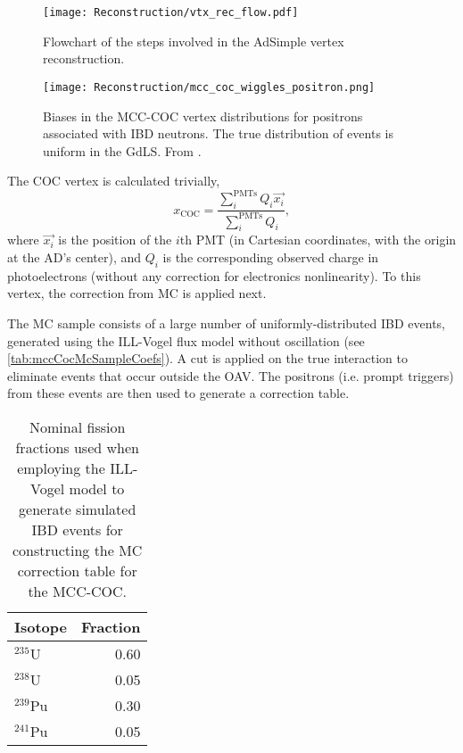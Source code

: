 \documentclass[../thesis.tex]{subfiles}
\begin{document}
\begin{figure}[h]
  \texttt{[image: Reconstruction/vtx\_rec\_flow.pdf]}
  \caption{Flowchart of the steps involved in the AdSimple vertex reconstruction.}
  \label{fig:vtx_rec_flow}
\end{figure}


\begin{figure}[h]
  \texttt{[image: Reconstruction/mcc\_coc\_wiggles\_positron.png]}
  \caption{Biases in the MCC-COC vertex distributions for positrons associated with IBD neutrons. The true distribution of events is uniform in the GdLS. From \cite{adsimple1}.}
  \label{fig:reconMccCocWiggles}
\end{figure}

The COC vertex is calculated trivially,
\begin{equation}
  x_{\mathrm{COC}} = \frac{\sum_{i}^{\mathrm{PMTs}} Q_i \vec{x_i}}{\sum_i^{\mathrm{PMTs}} Q_i},
\end{equation}
where $\vec{x_i}$ is the position of the $i$th PMT (in Cartesian coordinates, with the origin at the AD's center), and $Q_i$ is the corresponding observed charge in photoelectrons (without any correction for electronics nonlinearity). To this vertex, the correction from MC is applied next.

The MC sample consists of a large number of uniformly-distributed IBD events, generated using the ILL-Vogel flux model without oscillation (see \autoref{tab:mccCocMcSampleCoefs}). A cut is applied on the true interaction to eliminate events that occur outside the OAV. The positrons (i.e. prompt triggers) from these events are then used to generate a correction table.

\begin{table}[h]
  \begin{tabular}{lr}
    \toprule
    Isotope & Fraction \\
    \midrule
    $^{235}$U & 0.60 \\
    $^{238}$U & 0.05 \\
    $^{239}$Pu & 0.30 \\
    $^{241}$Pu & 0.05 \\
    \bottomrule
  \end{tabular}
  \caption{Nominal fission fractions used when employing the ILL-Vogel model to generate simulated IBD events for constructing the MC correction table for the MCC-COC.}
  \label{tab:mccCocMcSampleCoefs}
\end{table}
\end{document}
